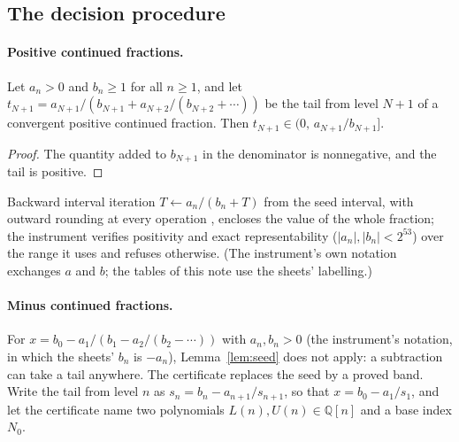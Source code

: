 \documentclass[11pt]{article}
\theoremstyle{definition}
\theoremstyle{plain}
\begin{document}
\subsection{The decision procedure}\label{sec:method}

\paragraph{Positive continued fractions.}
\begin{lemma}\label{lem:seed}
Let $a_n>0$ and $b_n\ge1$ for all $n\ge1$, and let $t_{N+1}=a_{N+1}/(b_{N+1}+a_{N+2}/(b_{N+2}+\cdots))$ be the tail from level $N+1$ of a convergent positive continued fraction. Then $t_{N+1}\in(0,\,a_{N+1}/b_{N+1}]$.
\end{lemma}
\begin{proof}
The quantity added to $b_{N+1}$ in the denominator is nonnegative, and the tail is positive.
\end{proof}
Backward interval iteration $T\leftarrow a_n/(b_n+T)$ from the seed interval, with outward rounding at every operation \cite{MKC09,Tu11}, encloses the value of the whole fraction; the instrument verifies positivity and exact representability ($|a_n|,|b_n|<2^{53}$) over the range it uses and refuses otherwise. (The instrument's own notation exchanges $a$ and $b$; the tables of this note use the sheets' labelling.)

\paragraph{Minus continued fractions.}\label{sec:minus}
For $x=b_0-a_1/(b_1-a_2/(b_2-\cdots))$ with $a_n,b_n>0$ (the instrument's notation, in which the sheets' $b_n$ is $-a_n$), Lemma~\ref{lem:seed} does not apply: a subtraction can take a tail anywhere. The certificate replaces the seed by a proved band. Write the tail from level $n$ as $s_n=b_n-a_{n+1}/s_{n+1}$, so that $x=b_0-a_1/s_1$, and let the certificate name two polynomials $L(n),U(n)\in\mathbb Q[n]$ and a base index $N_0$.
\end{document}
